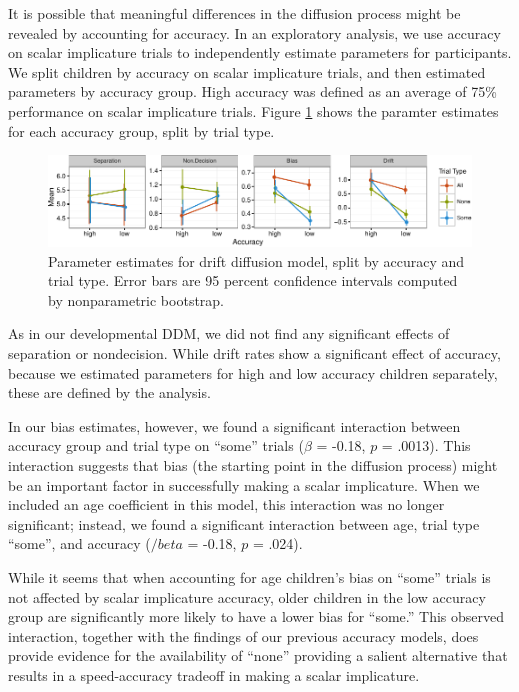 \documentclass[10pt, letterpaper]{article}
\newenvironment{CodeChunk}{}{}
\begin{document}
It is possible that meaningful differences in the diffusion process
might be revealed by accounting for accuracy. In an exploratory
analysis, we use accuracy on scalar implicature trials to independently
estimate parameters for participants. We split children by accuracy on
scalar implicature trials, and then estimated parameters by accuracy
group. High accuracy was defined as an average of 75\% performance on
scalar implicature trials. Figure \ref{fig:param_plot} shows the
paramter estimates for each accuracy group, split by trial type.

\begin{CodeChunk}
\begin{figure}[t]

{\centering \includegraphics{figs/param_plot-1} 

}

\caption[Parameter estimates for drift diffusion model, split by accuracy and trial type]{Parameter estimates for drift diffusion model, split by accuracy and trial type. Error bars are 95 percent confidence intervals computed by nonparametric bootstrap.}\label{fig:param_plot}
\end{figure}
\end{CodeChunk}

As in our developmental DDM, we did not find any significant effects of
separation or nondecision. While drift rates show a significant effect
of accuracy, because we estimated parameters for high and low accuracy
children separately, these are defined by the analysis.

In our bias estimates, however, we found a significant interaction
between accuracy group and trial type on ``some'' trials (\(\beta\) =
-0.18, \(p\) = .0013). This interaction suggests that bias (the starting
point in the diffusion process) might be an important factor in
successfully making a scalar implicature. When we included an age
coefficient in this model, this interaction was no longer significant;
instead, we found a significant interaction between age, trial type
``some'', and accuracy (\(/beta\) = -0.18, \(p\) = .024).

While it seems that when accounting for age children's bias on ``some''
trials is not affected by scalar implicature accuracy, older children in
the low accuracy group are significantly more likely to have a lower
bias for ``some.'' This observed interaction, together with the findings
of our previous accuracy models, does provide evidence for the
availability of ``none'' providing a salient alternative that results in
a speed-accuracy tradeoff in making a scalar implicature.
\end{document}
